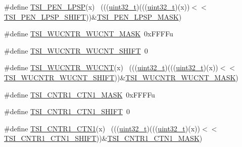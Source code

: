 \begin{DoxyCompactItemize}
\#define \hyperlink{group___t_s_i___register___masks_ga2c49a1ebc890fb8e3d4e7468c516d8fd}{T\+S\+I\+\_\+\+P\+E\+N\+\_\+\+L\+P\+SP}(x)                                                ~(((\hyperlink{_p_e___types_8h_a33594304e786b158f3fb30289278f5af}{uint32\+\_\+t})(((\hyperlink{_p_e___types_8h_a33594304e786b158f3fb30289278f5af}{uint32\+\_\+t})(x))$<$$<$\hyperlink{group___t_s_i___register___masks_ga8a4314c8664c97a0304050452d85779b}{T\+S\+I\+\_\+\+P\+E\+N\+\_\+\+L\+P\+S\+P\+\_\+\+S\+H\+I\+FT}))\&\hyperlink{group___t_s_i___register___masks_ga5c60f0233573e0a5436a8bf87600d347}{T\+S\+I\+\_\+\+P\+E\+N\+\_\+\+L\+P\+S\+P\+\_\+\+M\+A\+SK})
\item 
\#define \hyperlink{group___t_s_i___register___masks_gaa12e0ab73453118119dc56599e0a5598}{T\+S\+I\+\_\+\+W\+U\+C\+N\+T\+R\+\_\+\+W\+U\+C\+N\+T\+\_\+\+M\+A\+SK}~0x\+F\+F\+F\+Fu
\item 
\#define \hyperlink{group___t_s_i___register___masks_gab6de5e2e100b2608c1837b6114fb5117}{T\+S\+I\+\_\+\+W\+U\+C\+N\+T\+R\+\_\+\+W\+U\+C\+N\+T\+\_\+\+S\+H\+I\+FT}~0
\item 
\#define \hyperlink{group___t_s_i___register___masks_gabfa380c87734a1e8d767c8f743906660}{T\+S\+I\+\_\+\+W\+U\+C\+N\+T\+R\+\_\+\+W\+U\+C\+NT}(x)                                        ~(((\hyperlink{_p_e___types_8h_a33594304e786b158f3fb30289278f5af}{uint32\+\_\+t})(((\hyperlink{_p_e___types_8h_a33594304e786b158f3fb30289278f5af}{uint32\+\_\+t})(x))$<$$<$\hyperlink{group___t_s_i___register___masks_gab6de5e2e100b2608c1837b6114fb5117}{T\+S\+I\+\_\+\+W\+U\+C\+N\+T\+R\+\_\+\+W\+U\+C\+N\+T\+\_\+\+S\+H\+I\+FT}))\&\hyperlink{group___t_s_i___register___masks_gaa12e0ab73453118119dc56599e0a5598}{T\+S\+I\+\_\+\+W\+U\+C\+N\+T\+R\+\_\+\+W\+U\+C\+N\+T\+\_\+\+M\+A\+SK})
\item 
\#define \hyperlink{group___t_s_i___register___masks_ga7d2647f0e7166cd22930dc7d15726bdc}{T\+S\+I\+\_\+\+C\+N\+T\+R1\+\_\+\+C\+T\+N1\+\_\+\+M\+A\+SK}~0x\+F\+F\+F\+Fu
\item 
\#define \hyperlink{group___t_s_i___register___masks_ga51545c15d46b9d961b3cd8a2aed33e46}{T\+S\+I\+\_\+\+C\+N\+T\+R1\+\_\+\+C\+T\+N1\+\_\+\+S\+H\+I\+FT}~0
\item 
\#define \hyperlink{group___t_s_i___register___masks_ga2a691594a820a057852e27a1576af469}{T\+S\+I\+\_\+\+C\+N\+T\+R1\+\_\+\+C\+T\+N1}(x)                                            ~(((\hyperlink{_p_e___types_8h_a33594304e786b158f3fb30289278f5af}{uint32\+\_\+t})(((\hyperlink{_p_e___types_8h_a33594304e786b158f3fb30289278f5af}{uint32\+\_\+t})(x))$<$$<$\hyperlink{group___t_s_i___register___masks_ga51545c15d46b9d961b3cd8a2aed33e46}{T\+S\+I\+\_\+\+C\+N\+T\+R1\+\_\+\+C\+T\+N1\+\_\+\+S\+H\+I\+FT}))\&\hyperlink{group___t_s_i___register___masks_ga7d2647f0e7166cd22930dc7d15726bdc}{T\+S\+I\+\_\+\+C\+N\+T\+R1\+\_\+\+C\+T\+N1\+\_\+\+M\+A\+SK})
$$
\end{DoxyCompactItemize}
